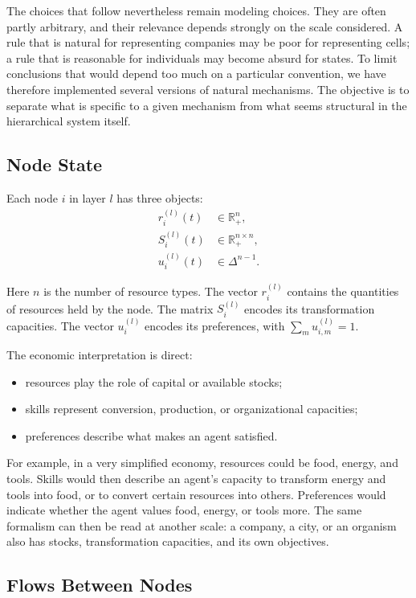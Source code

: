 \documentclass[11pt]{article}
\begin{document}
The choices that follow nevertheless remain modeling choices. They are often partly arbitrary, and their relevance depends strongly on the scale considered. A rule that is natural for representing companies may be poor for representing cells; a rule that is reasonable for individuals may become absurd for states. To limit conclusions that would depend too much on a particular convention, we have therefore implemented several versions of natural mechanisms. The objective is to separate what is specific to a given mechanism from what seems structural in the hierarchical system itself.

\subsection{Node State}

Each node $i$ in layer $l$ has three objects:
\begin{align}
    r_i^{(l)}(t) &\in \mathbb{R}_+^{n}, \\
    S_i^{(l)}(t) &\in \mathbb{R}_+^{n \times n}, \\
    u_i^{(l)}(t) &\in \Delta^{n-1}.
\end{align}

Here $n$ is the number of resource types. The vector $r_i^{(l)}$ contains the quantities of resources held by the node. The matrix $S_i^{(l)}$ encodes its transformation capacities. The vector $u_i^{(l)}$ encodes its preferences, with $\sum_m u_{i,m}^{(l)} = 1$.

The economic interpretation is direct:
\begin{itemize}
    \item resources play the role of capital or available stocks;
    \item skills represent conversion, production, or organizational capacities;
    \item preferences describe what makes an agent satisfied.
\end{itemize}

For example, in a very simplified economy, resources could be food, energy, and tools. Skills would then describe an agent's capacity to transform energy and tools into food, or to convert certain resources into others. Preferences would indicate whether the agent values food, energy, or tools more. The same formalism can then be read at another scale: a company, a city, or an organism also has stocks, transformation capacities, and its own objectives.

\subsection{Flows Between Nodes}
\end{document}
